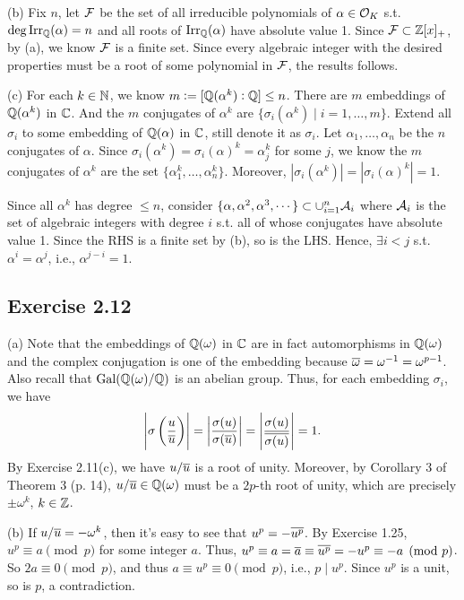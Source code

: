 \documentclass[../Marcus.tex]{subfiles}
\begin{document}
(b) Fix $n$, let $\mathcal{F}$ be the set of all irreducible polynomials of $\alpha\in\mathcal{O}_K$ s.t. $\deg\operatorname{Irr}_{\mathbb{Q}}(\alpha)=n$ and all roots of $\operatorname{Irr}_{\mathbb{Q}}(\alpha)$ have absolute value 1. Since $\mathcal{F}\subset\mathbb{Z}[x]_+$, by (a), we know $\mathcal{F}$ is a finite set. Since every algebraic integer with the desired properties must be a root of some polynomial in $\mathcal{F}$, the results follows.

(c) For each $k\in\mathbb{N}$, we know $m:=[\mathbb{Q}(\alpha^k):\mathbb{Q}] \leq n$. There are $m$ embeddings of $\mathbb{Q}(\alpha^k)$ in $\mathbb{C}$. And the $m$ conjugates of $\alpha^k$ are $\{\sigma_i(\alpha^k)\mid i=1,\ldots,m\}$. Extend all $\sigma_i$ to some embedding of $\mathbb{Q}(\alpha)$ in $\mathbb{C}$, still denote it as $\sigma_i$. Let $\alpha_1,\ldots,\alpha_n$ be the $n$ conjugates of $\alpha$. Since $\sigma_i(\alpha^k)=\sigma_i(\alpha)^k=\alpha_j^k$ for some $j$, we know the $m$ conjugates of $\alpha^k$ are the set $\{\alpha_1^k,\ldots,\alpha_n^k\}$. Moreover, $|\sigma_i(\alpha^k)|=|\sigma_i(\alpha)^k|=1$.

Since all $\alpha^k$ has degree $\leq n$, consider $\{\alpha,\alpha^2,\alpha^3,\cdots\} \subset \cup_{i=1}^n \mathcal{A}_i$ where $\mathcal{A}_i$ is the set of algebraic integers with degree $i$ s.t. all of whose conjugates have absolute value 1. Since the RHS is a finite set by (b), so is the LHS. Hence, $\exists i< j$ s.t. $\alpha^i=\alpha^j$, i.e., $\alpha^{j-i}=1$.

\subsection*{Exercise 2.12}

(a) Note that the embeddings of $\mathbb{Q}(\omega)$ in $\mathbb{C}$ are in fact automorphisms in $\mathbb{Q}(\omega)$ and the complex conjugation is one of the embedding because $\overline{\omega}=\omega^{-1}=\omega^{p-1}$. Also recall that $\operatorname{Gal}(\mathbb{Q}(\omega)/\mathbb{Q})$ is an abelian group. Thus, for each embedding $\sigma_i$, we have 
$$
\left|\sigma\left(\frac{u}{\overline{u}}\right)\right| = \left|\frac{\sigma(u)}{\sigma(\overline{u})}\right| = \left|\frac{\sigma(u)}{\overline{\sigma(u)}}\right| = 1.
$$ 
By Exercise 2.11(c), we have $u/\overline{u}$ is a root of unity. Moreover, by Corollary 3 of Theorem 3 (p. 14), $u/\overline{u}\in\mathbb{Q}(\omega)$ must be a $2p$-th root of unity, which are precisely $\pm \omega^k$, $k\in\mathbb{Z}$.

(b) If $u/\overline{u}=-\omega^k$, then it's easy to see that $u^p=-\overline{u^p}$. By Exercise 1.25, $u^p\equiv a \pmod{p}$ for some integer $a$. Thus, $u^p \equiv a = \overline{a} \equiv \overline{u^p} = -u^p \equiv -a \pmod{p}$. So $2a\equiv 0 \pmod{p}$, and thus $a\equiv u^p \equiv0 \pmod{p}$, i.e., $p\mid u^p$. Since $u^p$ is a unit, so is $p$, a contradiction.
\end{document}
